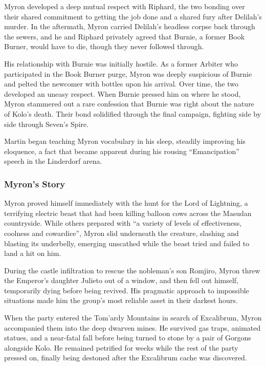 Myron developed a deep mutual respect with Riphard, the two bonding over their shared commitment to getting the job done and a shared fury after Delilah's murder.  In the aftermath, Myron carried Delilah's headless corpse back through the sewers, and he and Riphard privately agreed that Burnie, a former Book Burner, would have to die, though they never followed through.

His relationship with Burnie was initially hostile.  As a former Arbiter who participated in the Book Burner purge, Myron was deeply suspicious of Burnie and pelted the newcomer with bottles upon his arrival.  Over time, the two developed an uneasy respect.  When Burnie pressed him on where he stood, Myron stammered out a rare confession that Burnie was right about the nature of Kolo's death.  Their bond solidified through the final campaign, fighting side by side through Seven's Spire.

Martin began teaching Myron vocabulary in his sleep, steadily improving his eloquence, a fact that became apparent during his rousing ``Emancipation'' speech in the Linderdorf arena.

\subsubsection{Myron's Story}

Myron proved himself immediately with the hunt for the Lord of Lightning, a terrifying electric beast that had been killing balloon cows across the Masudan countryside.  While others prepared with ``a variety of levels of effectiveness, coolness and cowardice'', Myron slid underneath the creature, slashing and blasting its underbelly, emerging unscathed while the beast tried and failed to land a hit on him.

During the castle infiltration to rescue the nobleman's son Romjiro, Myron threw the Emperor's daughter Julieto out of a window, and then fell out himself, temporarily dying before being revived.  His pragmatic approach to impossible situations made him the group's most reliable asset in their darkest hours.

When the party entered the Tom'ardy Mountains in search of Excalibrum, Myron accompanied them into the deep dwarven mines.  He survived gas traps, animated statues, and a near-fatal fall before being turned to stone by a pair of Gorgons alongside Kolo.  He remained petrified for weeks while the rest of the party pressed on, finally being destoned after the Excalibrum cache was discovered.

